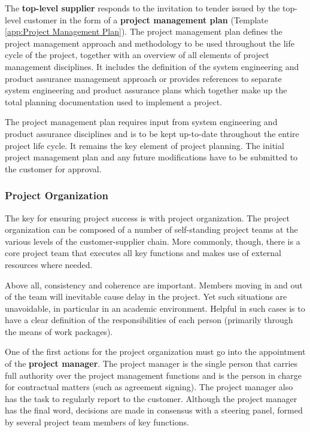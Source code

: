 The \textbf{top-level supplier} responds to the invitation to tender issued by the top-level customer in the form of a \textbf{project management plan} (Template \ref{app:Project Management Plan}). The project management plan defines the project management approach and methodology to be used throughout the life cycle of the project, together with an overview of all elements of project management disciplines. It includes the definition of the system engineering and product assurance management approach or provides references to separate system engineering and product assurance plans which together make up the total planning documentation used to implement a project.

The project management plan requires input from system engineering and product assurance disciplines and is to be kept up-to-date throughout the entire project life cycle. It remains the key element of project planning. The initial project management plan and any future modifications have to be submitted to the customer for approval.

\subsubsection{Project Organization}

The key for ensuring project success is with project organization. The project organization can be composed of a number of self-standing project teams at the various levels of the customer-supplier chain. More commonly, though, there is a core project team that executes all key functions and makes use of external resources where needed. 

Above all, consistency and coherence are important. Members moving in and out of the team will inevitable cause delay in the project. Yet such situations are unavoidable, in particular in an academic environment. Helpful in such cases is to have a clear definition of the responsibilities of each person (primarily through the means of work packages). 

One of the first actions for the project organization must go into the appointment of the \textbf{project manager}. The project manager is the single person that carries full authority over the project management functions and is the person in charge for contractual matters (such as agreement signing). The project manager also has the task to regularly report to the customer. Although the project manager has the final word, decisions are made in consensus with a steering panel, formed by several project team members of key functions. 

